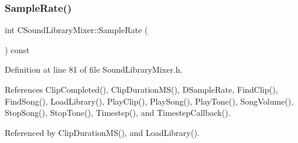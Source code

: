 \subsubsection{\texorpdfstring{Sample\+Rate()}{SampleRate()}}
{\footnotesize\ttfamily int C\+Sound\+Library\+Mixer\+::\+Sample\+Rate (\begin{DoxyParamCaption}{ }\end{DoxyParamCaption}) const\hspace{0.3cm}{\ttfamily [inline]}}



Definition at line 81 of file Sound\+Library\+Mixer.\+h.



References Clip\+Completed(), Clip\+Duration\+M\+S(), D\+Sample\+Rate, Find\+Clip(), Find\+Song(), Load\+Library(), Play\+Clip(), Play\+Song(), Play\+Tone(), Song\+Volume(), Stop\+Song(), Stop\+Tone(), Timestep(), and Timestep\+Callback().



Referenced by Clip\+Duration\+M\+S(), and Load\+Library().


